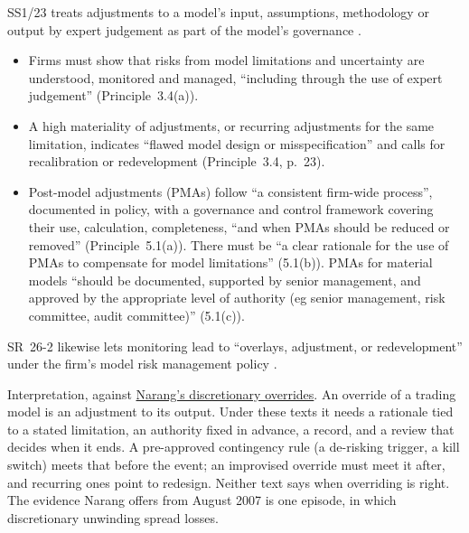 \begin{qfmethod}\label{meth:discretionary-override-governance}
 SS1/23 treats adjustments to a model's input, assumptions, methodology or output by expert judgement as part of the model's governance \citep[Principles~3.4 and~5.1, PDF pp.~22--23 and~28]{wide-pra-ss123}.
\begin{itemize}
\item Firms must show that risks from model limitations and uncertainty are understood, monitored and managed, ``including through the use of expert judgement'' (Principle~3.4(a)).
\item A high materiality of adjustments, or recurring adjustments for the same limitation, indicates ``flawed model design or misspecification'' and calls for recalibration or redevelopment (Principle~3.4, p.~23).
\item Post-model adjustments (PMAs) follow ``a consistent firm-wide process'', documented in policy, with a governance and control framework covering their use, calculation, completeness, ``and when PMAs should be reduced or removed'' (Principle~5.1(a)). There must be ``a clear rationale for the use of PMAs to compensate for model limitations'' (5.1(b)). PMAs for material models ``should be documented, supported by senior management, and approved by the appropriate level of authority (eg senior management, risk committee, audit committee)'' (5.1(c)).
\end{itemize}
SR~26-2 likewise lets monitoring lead to ``overlays, adjustment, or redevelopment'' under the firm's model risk management policy \citep[sec.~V, PDF p.~9]{sr-26-2-2026}.

 Interpretation, against \hyperref[def:quant-strategy-risk-sources]{Narang's discretionary overrides}. An override of a trading model is an adjustment to its output. Under these texts it needs a rationale tied to a stated limitation, an authority fixed in advance, a record, and a review that decides when it ends. A pre-approved contingency rule (a de-risking trigger, a kill switch) meets that before the event; an improvised override must meet it after, and recurring ones point to redesign. Neither text says when overriding is right. The evidence Narang offers from August 2007 is one episode, in which discretionary unwinding spread losses.


\end{qfmethod}
